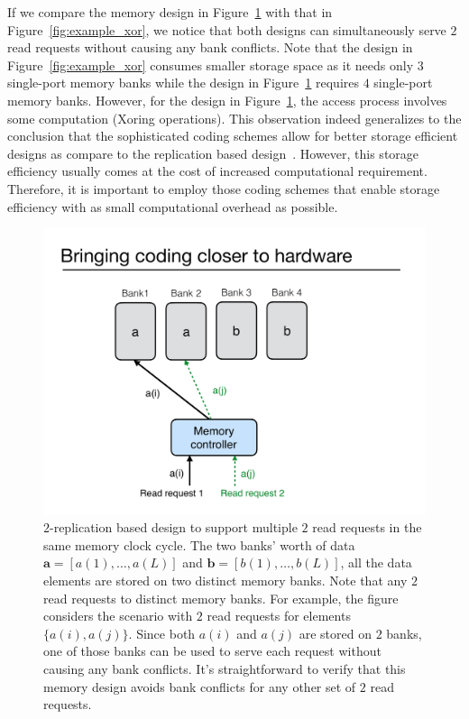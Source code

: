 \begin{remark}
\label{rem:read_only}
If we compare the memory design in Figure~\ref{fig:read_replication} with that in Figure~\ref{fig:example_xor}, we notice that both designs can simultaneously serve $2$ read requests without causing any bank conflicts. Note that the design in Figure~\ref{fig:example_xor} consumes smaller storage space as it needs only $3$ single-port memory banks while the design in  Figure~\ref{fig:read_replication} requires $4$ single-port memory banks. However, for the design in Figure~\ref{fig:read_replication}, the access process involves some computation (Xoring operations). {\color{red}This observation indeed generalizes to the conclusion that the sophisticated coding schemes allow for better storage efficient designs as compare to the replication based design~\cite{MacSlo}. However, this storage efficiency usually comes at the cost of increased computational requirement. Therefore, it is important to employ those coding schemes that enable storage efficiency with as small computational overhead as possible.}
\end{remark}

\begin{figure}[t!]
\centering
\includegraphics[width=0.425\linewidth]{fig/read-replication.pdf}
\caption{$2$-replication based design to support multiple $2$ read requests in the same memory clock cycle. The two banks' worth of data $\mathbf{a} = [a(1),\ldots, a(L)]$ and $\mathbf{b} = [b(1),\ldots, b(L)]$, all the data elements are stored on two distinct memory banks. Note that any $2$ read requests to distinct memory banks. For example, the figure considers the scenario with $2$ read requests for elements $\{a(i), a(j)\}$. Since both $a(i)$ and $a(j)$ are stored on $2$ banks, one of those banks can be used to serve each request without causing any bank conflicts. It's straightforward to verify that this memory design avoids bank conflicts for any other set of $2$ read requests.}
\label{fig:read_replication}
\end{figure}

